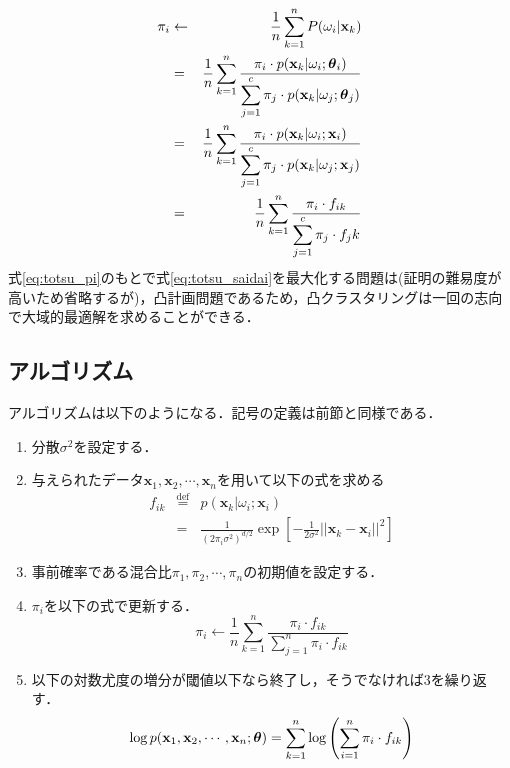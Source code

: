 \documentclass[a4j]{jsarticle}
\def\vec#1{\mbox{\boldmath $#1$}}
\begin{document}
\begin{eqnarray}
	\pi_i &\leftarrow& \frac{1}{n}\sum_{k=1}^{n}P(\omega_i|\textbf{x}_k) \nonumber \\
	&=& \frac{1}{n}\sum_{k=1}^{n}\frac{\pi_i\cdot p(\textbf{x}_k|\omega_i;\vec\theta_i)}{\displaystyle\sum_{j=1}^{c} \pi_j\cdot p(\textbf{x}_k|\omega_j;\vec\theta_j)} \nonumber \\
	&=& \frac{1}{n}\sum_{k=1}^{n}\frac{\pi_i\cdot p(\textbf{x}_k|\omega_i;\textbf{x}_i)}{\displaystyle\sum_{j=1}^{c} \pi_j\cdot p(\textbf{x}_k|\omega_j;\textbf{x}_j)} \nonumber \\
	&=& \frac{1}{n}\sum_{k=1}^{n}\frac{\pi_i\cdot f_{ik}                            }{\displaystyle\sum_{j=1}^{c} \pi_j\cdot f_jk}
\end{eqnarray}
式\ref{eq:totsu_pi}のもとで式\ref{eq:totsu_saidai}を最大化する問題は(証明の難易度が高いため省略するが)，凸計画問題であるため，凸クラスタリングは一回の志向で大域的最適解を求めることができる．
\subsection{アルゴリズム}
アルゴリズムは以下のようになる．記号の定義は前節と同様である．

\begin{enumerate}
	\item 分散$\sigma^2$を設定する．
	\item 与えられたデータ$\textbf{x}_1,\textbf{x}_2,\cdots,\textbf{x}_n$を用いて以下の式を求める
	\begin{eqnarray*}
		f_{ik} &\overset{\mathrm{def}}{=}& p(\textbf{x}_k|\omega_i;\textbf{x}_i) \\
		& = & \frac{1}{(2\pi_i\sigma^2)^{d/2}}\exp\left[-\frac{1}{2\sigma^2}||\textbf{x}_k - \textbf{x}_i||^2\right]
	\end{eqnarray*}
	\item 事前確率である混合比$\pi_1,\pi_2,\cdots,\pi_n$の初期値を設定する．
	\item $\pi_i$を以下の式で更新する．
	\begin{equation}
		\pi_i \leftarrow \frac{1}{n}\sum_{k=1}^{n}\frac{\displaystyle \pi_i\cdot f_{ik}}{\displaystyle \sum_{j=1}^{n}\pi_i\cdot f_{ik}}
	\end{equation}
	\item 以下の対数尤度の増分が閾値以下なら終了し，そうでなければ3を繰り返す．
	\begin{equation}
		\log p(\textbf{x}_1,\textbf{x}_2,\cdots,\textbf{x}_n;\vec\theta)= \sum_{k=1}^{n}\log \left(\sum_{i=1}^{n}\pi_i\cdot f_{ik}\right)
	\end{equation}
\end{enumerate}
\end{document}
